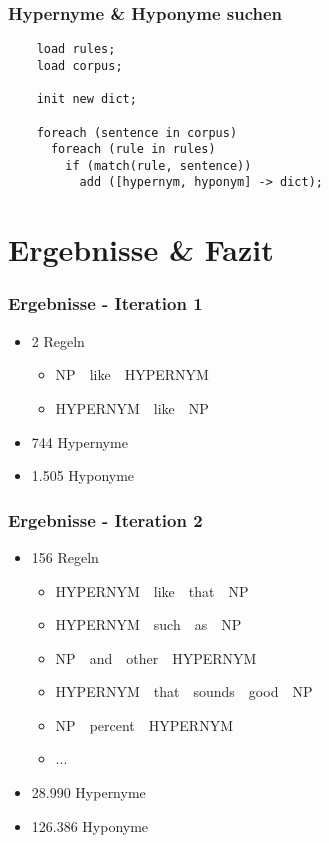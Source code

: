 \begin{frame}[fragile]
  \frametitle{Hypernyme \& Hyponyme suchen}

  \begin{lstlisting}
    load rules;
    load corpus;

    init new dict;

    foreach (sentence in corpus)
      foreach (rule in rules)
        if (match(rule, sentence))
          add ([hypernym, hyponym] -> dict);
  \end{lstlisting}
\end{frame}

\section{Ergebnisse \& Fazit}

\begin{frame}
  \frametitle{Ergebnisse - Iteration 1}

  \begin{itemize}
  \item 2 Regeln
    \begin{itemize}
    \item NP~\textpipe~like~\textpipe~HYPERNYM
    \item HYPERNYM~\textpipe~like~\textpipe~NP
    \end{itemize}

  \item 744 Hypernyme
  \item 1.505 Hyponyme
  \end{itemize}
\end{frame}

\begin{frame}
  \frametitle{Ergebnisse - Iteration 2}

  \begin{itemize}
  \item 156 Regeln
    \begin{itemize}
    \item HYPERNYM~\textpipe~like~\textpipe~that~\textpipe~NP
    \item HYPERNYM~\textpipe~such~\textpipe~as~\textpipe~NP
    \item NP~\textpipe~and~\textpipe~other~\textpipe~HYPERNYM
    \item HYPERNYM~\textpipe~that~\textpipe~sounds~\textpipe~good~\textpipe~NP
    \item NP~\textpipe~percent~\textpipe~HYPERNYM
    \item ...
    \end{itemize}

  \item 28.990 Hypernyme
  \item 126.386 Hyponyme
  \end{itemize}
\end{frame}

